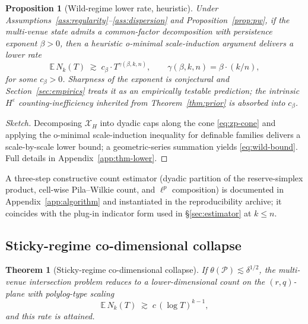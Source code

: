 \documentclass[12pt]{article}
\theoremstyle{sampledef}
\theoremstyle{sampleplain}
\newtheorem{theorem}[definition]{Theorem}
\newtheorem{proposition}[definition]{Proposition}
\theoremstyle{sampleremark}
\newcommand{\E}{\mathbb{E}}
\newcommand{\1}{\mathbf{1}}
\begin{document}
\begin{proposition}[Wild-regime lower rate, heuristic]\label{thm:lower}
Under Assumptions~\ref{ass:regularity}--\ref{ass:dispersion} and
Proposition~\ref{prop:pw}, if the multi-venue state admits a
common-factor decomposition with persistence exponent $\beta > 0$,
then a heuristic o-minimal scale-induction argument delivers a
lower rate
\begin{equation}\label{eq:wild-bound}
\E\,N_k(T) \;\gtrsim\; c_\beta \cdot T^{\gamma(\beta,k,n)},
\qquad \gamma(\beta,k,n) = \beta \cdot (k/n),
\end{equation}
for some $c_\beta > 0$. Sharpness of the exponent is conjectural
and Section~\ref{sec:empirics} treats it as an empirically testable
prediction; the intrinsic $H^\varepsilon$ counting-inefficiency
inherited from Theorem~\ref{thm:prior} is absorbed into $c_\beta$.
\end{proposition}

\begin{proof}[Sketch]
Decomposing $\mathcal{X}_H$ into dyadic caps along the cone
\eqref{eq:zp-cone} and applying the o-minimal scale-induction
inequality for definable families
\citep{PeterzilStarchenko2008, BakkerKlinglerTsimerman2020}
delivers a scale-by-scale lower bound; a geometric-series
summation yields \eqref{eq:wild-bound}. Full details in
Appendix~\ref{app:thm-lower}.
\end{proof}

A three-step constructive count estimator (dyadic partition of the
reserve-simplex product, cell-wise Pila--Wilkie count, and
$\ell^p$ composition) is documented in
Appendix~\ref{app:algorithm} and instantiated in the
reproducibility archive; it coincides with the plug-in indicator
form used in \S\ref{sec:estimator} at $k \le n$.

\subsection{Sticky-regime co-dimensional collapse}
\label{sec:thm-sticky}

\begin{theorem}[Sticky-regime co-dimensional collapse]\label{thm:sticky}
If $\theta(\mathcal{P}) \lesssim \delta^{1/2}$, the multi-venue
intersection problem reduces to a lower-dimensional count on the
$(r,q)$-plane with polylog-type scaling
\begin{equation}\label{eq:sticky}
\E\,N_k(T) \;\gtrsim\; c\,(\log T)^{k-1},
\end{equation}
and this rate is attained.
\end{theorem}
\end{document}
